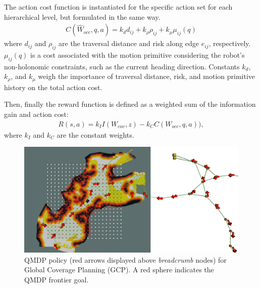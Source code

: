 \documentclass[letterpaper]{article} %
\begin{document}
The action cost function is instantiated for the specific action set for each hierarchical level, but formulated in the same way.
\begin{align}
    C(\hat{W}_{occ}, q, a) = k_d d_{ij} + k_\rho \rho_{ij} + k_\mu \mu_{ij}(q)
\end{align}
where $d_{ij}$ and $\rho_{ij}$ are the traversal distance and risk along edge $e_{ij}$, respectively.
$\mu_{ij}(q)$ is a cost associated with the motion primitive considering the robot's non-holonomic constraints, such as the current heading direction. Constants $k_d$, $k_\rho$, and $k_\mu$ weigh the importance of traversal distance, risk, and motion primitive history on the total action cost.

Then, finally the reward function is defined as a weighted sum of the information gain and action cost:
\begin{align}
    R(s, a) = k_I I(W_{cov}, z) - k_C C(W_{occ}, q, a)),
\end{align}
where $k_I$ and $k_C$ are the constant weights.



\begin{figure}[t!]
  \centering
  \includegraphics[width=.8\columnwidth]{figures/QMDP_Policy.png}
  \caption{QMDP policy (red arrows displayed above \textit{breadcrumb} nodes) for Global Coverage Planning (GCP). A red sphere indicates the QMDP frontier goal.}
  \label{fig:graph-level-planner}
\end{figure}
\end{document}

